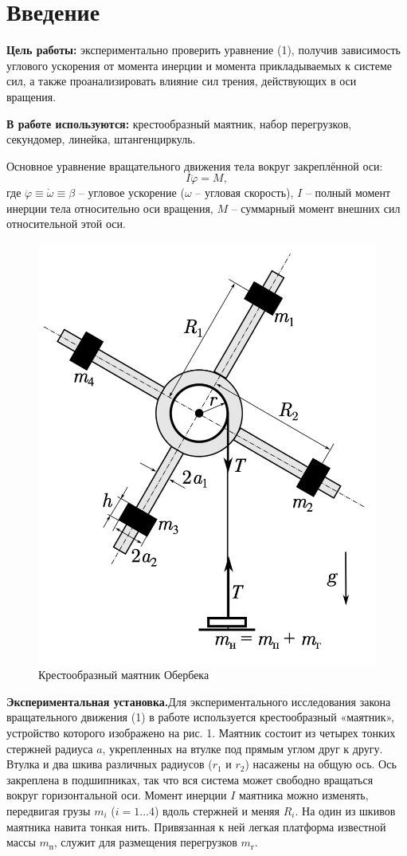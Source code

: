 \section{Введение}

\textbf{Цель работы:}
экспериментально проверить уравнение (1), получив зависимость углового ускорения от момента инерции и момента прикладываемых к системе сил, а также проанализировать влияние сил трения, действующих в оси вращения.

\textbf{В работе используются:}
крестообразный маятник, набор перегрузков, секундомер, линейка, штангенциркуль.


Основное уравнение вращательного движения тела вокруг закреплённой оси:
\begin{equation}
    I \ddot{\varphi} = M,
\end{equation}
где $\ddot{\varphi} \equiv \dot{\omega} \equiv \beta$ -- угловое ускорение ($\omega$ -- угловая скорость), $I$ -- полный момент инерции тела относительно оси вращения, $M$ -- суммарный момент внешних сил относительной этой оси.

\begin{figure}[H]
    \centering
\includegraphics[width=0.47\linewidth,center]{p1.png}
    \caption{Крестообразный маятник Обербека}
    \label{fig:my_label}
\end{figure}

\textbf{Экспериментальная установка.}Для экспериментального исследования закона вращательного движения (1) в работе используется крестообразный «маятник», устройство которого изображено на рис. 1.
Маятник состоит из четырех тонких стержней радиуса $a$, укрепленных
на втулке под прямым углом друг к другу. Втулка и два шкива различных радиусов ($r_1$ и $r_2$) насажены на общую ось. Ось закреплена в подшипниках, так что вся система может свободно вращаться вокруг горизонтальной оси. Момент инерции $I$ маятника можно изменять, передвигая грузы $m_i$ ($i = 1\dots4$) вдоль стержней и меняя $R_i$. На один из шкивов маятника навита тонкая нить. Привязанная к ней легкая платформа известной массы $m_\text{п}$, служит для размещения перегрузков $m_\text{г}$.

